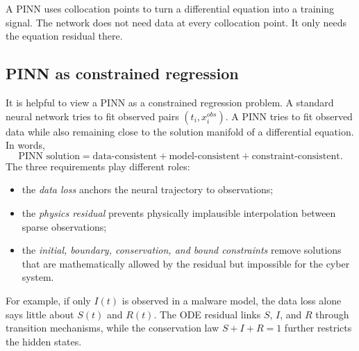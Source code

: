 \documentclass[11pt,a4paper]{article}
\begin{document}
\begin{center}
\end{center}

\begin{takeaway}
A PINN uses collocation points to turn a differential equation into a training signal. The network does not need data at every collocation point. It only needs the equation residual there.
\end{takeaway}

\subsection{PINN as constrained regression}
It is helpful to view a PINN as a constrained regression problem. A standard neural network tries to fit observed pairs $(t_i,x_i^{obs})$. A PINN tries to fit observed data while also remaining close to the solution manifold of a differential equation. In words,
\begin{equation}
    \text{PINN solution} = \text{data-consistent} + \text{model-consistent} + \text{constraint-consistent}.
\end{equation}
The three requirements play different roles:
\begin{itemize}[leftmargin=2em]
    \item the \emph{data loss} anchors the neural trajectory to observations;
    \item the \emph{physics residual} prevents physically implausible interpolation between sparse observations;
    \item the \emph{initial, boundary, conservation, and bound constraints} remove solutions that are mathematically allowed by the residual but impossible for the cyber system.
\end{itemize}
For example, if only $I(t)$ is observed in a malware model, the data loss alone says little about $S(t)$ and $R(t)$. The ODE residual links $S$, $I$, and $R$ through transition mechanisms, while the conservation law $S+I+R=1$ further restricts the hidden states.
\end{document}
